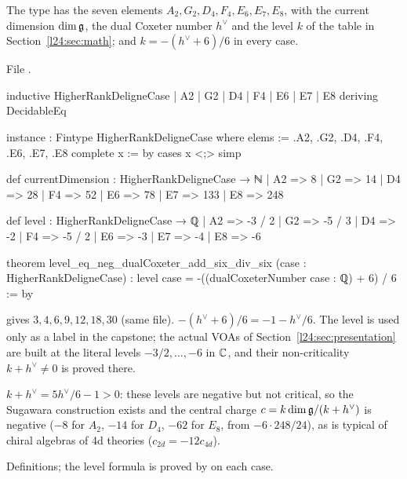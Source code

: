 \begin{definition}\label{l24:def:case}
The type  has the seven elements $A_2,G_2,D_4,F_4,E_6,E_7,E_8$, with the current
dimension $\dim\mathfrak g$, the dual Coxeter number $h^\vee$ and the level $k$ of the table in
Section~\ref{l24:sec:math}; and $k=-(h^\vee+6)/6$ in every case.
\end{definition}
\noindent File .
\begin{leancode}
inductive HigherRankDeligneCase
  | A2
  | G2
  | D4
  | F4
  | E6
  | E7
  | E8
  deriving DecidableEq

instance : Fintype HigherRankDeligneCase where
  elems := {.A2, .G2, .D4, .F4, .E6, .E7, .E8}
  complete x := by cases x <;> simp

def currentDimension : HigherRankDeligneCase → ℕ
  | A2 => 8
  | G2 => 14
  | D4 => 28
  | F4 => 52
  | E6 => 78
  | E7 => 133
  | E8 => 248

def level : HigherRankDeligneCase → ℚ
  | A2 => -3 / 2
  | G2 => -5 / 3
  | D4 => -2
  | F4 => -5 / 2
  | E6 => -3
  | E7 => -4
  | E8 => -6

theorem level_eq_neg_dualCoxeter_add_six_div_six
    (case : HigherRankDeligneCase) :
    level case = -((dualCoxeterNumber case : ℚ) + 6) / 6 := by
\end{leancode}

\begin{dictionary}
 gives $3,4,6,9,12,18,30$ (same file). $-(h^\vee+6)/6=-1-h^\vee/6$. The level
is used only as a label in the capstone; the actual VOAs of Section~\ref{l24:sec:presentation} are built at
the literal levels $-3/2,\dots,-6$ in ${\mathbb{C}}$, and their non-criticality $k+h^\vee\neq0$ is proved there.
\end{dictionary}

\begin{physics}
$k+h^\vee=5h^\vee/6-1>0$: these levels are negative but not critical, so the Sugawara construction exists
and the central charge $c=k\dim\mathfrak g/(k+h^\vee)$ is negative ($-8$ for $A_2$, $-14$ for $D_4$,
$-62$ for $E_8$, from $-6\cdot248/24$), as is typical of chiral algebras of 4d theories ($c_{2d}=-12c_{4d}$).
\end{physics}

\begin{status}
Definitions; the level formula is proved by  on each case.
\end{status}

